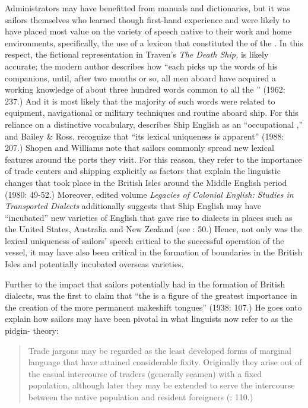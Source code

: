 Administrators may have benefitted from manuals and dictionaries, but it was sailors themselves who learned though first-hand experience and were likely to have placed most value on the variety of speech native to their work and home environments, specifically, the use of a lexicon that constituted the  of the . In this respect, the fictional representation in Traven’s \textit{The Death Ship,} is likely accurate; the modern author describes how “each  picks up the words of his companions, until, after two months or so, all men aboard have acquired a working knowledge of about three hundred words common to all the ” (1962: 237.) And it is most likely that the majority of such words were related to equipment, navigational or military techniques and routine aboard ship. For this reliance on a distinctive vocabulary, \citet{Hancock1986} describes Ship English as an “occupational ,” and Bailey \& Ross, recognize that “its lexical uniqueness is apparent” (1988: 207.) Shopen and Williams note that sailors commonly spread new lexical features around the ports they visit. For this reason, they refer to the importance of trade centers and shipping explicitly as factors that explain the linguistic changes that took place in the British Isles around the Middle English period (1980: 49-52.) Moreover,  edited volume \textit{Legacies of Colonial English: Studies in Transported Dialects} additionally suggests that Ship English may have “incubated” new varieties of English that gave rise to dialects in places such as the United States, Australia and New Zealand (see \citealt{Hickey2004}: 50.) Hence, not only was the lexical uniqueness of sailors’ speech critical to the successful operation of the vessel, it may have also been critical in the formation of  boundaries in the British Isles and potentially incubated overseas varieties.

Further to the impact that sailors potentially had in the formation of British dialects, \citet{Reinecke1938} was the first to claim that “the  is a figure of the greatest importance in the creation of the more permanent makeshift tongues” (1938: 107.) He goes onto explain how sailors may have been pivotal in what linguists now refer to as the pidgin- theory:

\begin{quotation}
Trade jargons may be regarded as the least developed forms of marginal language that have attained considerable fixity. Originally they arise out of the casual intercourse of traders (generally seamen) with a fixed population, although later they may be extended to serve the intercourse between the native population and resident foreigners (\citealt{Reinecke1938}: 110.) \end{quotation}

